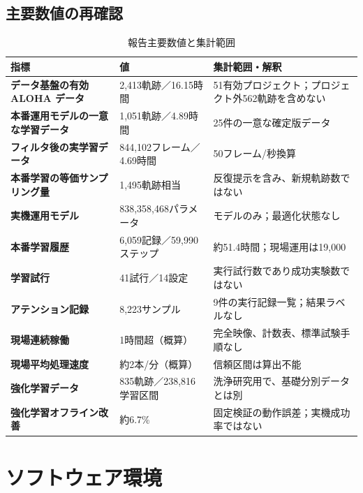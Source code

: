 \begin{landscape}
\section{主要数値の再確認}
\begin{table}[H]
\centering\small
\caption{報告主要数値と集計範囲}
\begin{tabularx}{\linewidth}{>{\bfseries}p{66mm}p{48mm}X}
\toprule
指標 & 値 & 集計範囲・解釈\\
\midrule
データ基盤の有効 ALOHA データ & 2,413軌跡／16.15時間 & 51有効プロジェクト；プロジェクト外562軌跡を含めない\\
本番運用モデルの一意な学習データ & 1,051軌跡／4.89時間 & 25件の一意な確定版データ\\
フィルタ後の実学習データ & 844,102フレーム／4.69時間 & 50フレーム/秒換算\\
本番学習の等価サンプリング量 & 1,495軌跡相当 & 反復提示を含み、新規軌跡数ではない\\
実機運用モデル & 838,358,468パラメータ & モデルのみ；最適化状態なし\\
本番学習履歴 & 6,059記録／59,990ステップ & 約51.4時間；現場運用は19,000\\
学習試行 & 41試行／14設定 & 実行試行数であり成功実験数ではない\\
アテンション記録 & 8,223サンプル & 9件の実行記録一覧；結果ラベルなし\\
現場連続稼働 & 1時間超（概算） & 完全映像、計数表、標準試験手順なし\\
現場平均処理速度 & 約2本/分（概算） & 信頼区間は算出不能\\
強化学習データ & 835軌跡／238,816学習区間 & 洗浄研究用で、基礎分別データとは別\\
強化学習オフライン改善 & 約6.7\% & 固定検証の動作誤差；実機成功率ではない\\
\bottomrule
\end{tabularx}
\end{table}
\end{landscape}

\section{ソフトウェア環境}

